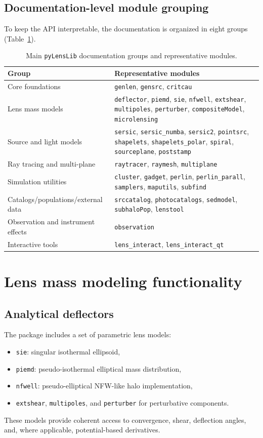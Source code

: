 \documentclass{aa}
\newcommand{\pylenslib}{\texttt{pyLensLib}\xspace}
\begin{document}
\subsection{Documentation-level module grouping}
To keep the API interpretable, the documentation is organized in eight groups (Table~\ref{tab:groups}).

\begin{table}
\caption{Main \pylenslib documentation groups and representative modules.}
\label{tab:groups}
\centering
\begin{tabular}{ll}
\toprule
\textbf{Group} & \textbf{Representative modules} \\
\midrule
Core foundations & \texttt{genlen}, \texttt{gensrc}, \texttt{critcau} \\
Lens mass models & \texttt{deflector}, \texttt{piemd}, \texttt{sie}, \texttt{nfwell}, \texttt{extshear}, \texttt{multipoles}, \texttt{perturber}, \texttt{compositeModel}, \texttt{microlensing} \\
Source and light models & \texttt{sersic}, \texttt{sersic\_numba}, \texttt{sersic2}, \texttt{pointsrc}, \texttt{shapelets}, \texttt{shapelets\_polar}, \texttt{spiral}, \texttt{sourceplane}, \texttt{poststamp} \\
Ray tracing and multi-plane & \texttt{raytracer}, \texttt{raymesh}, \texttt{multiplane} \\
Simulation utilities & \texttt{cluster}, \texttt{gadget}, \texttt{perlin}, \texttt{perlin\_parall}, \texttt{samplers}, \texttt{maputils}, \texttt{subfind} \\
Catalogs/populations/external data & \texttt{srccatalog}, \texttt{photocatalogs}, \texttt{sedmodel}, \texttt{subhaloPop}, \texttt{lenstool} \\
Observation and instrument effects & \texttt{observation} \\
Interactive tools & \texttt{lens\_interact}, \texttt{lens\_interact\_qt} \\
\bottomrule
\end{tabular}
\end{table}

\section{Lens mass modeling functionality}
\subsection{Analytical deflectors}
The package includes a set of parametric lens models:
\begin{itemize}
\item \texttt{sie}: singular isothermal ellipsoid,
\item \texttt{piemd}: pseudo-isothermal elliptical mass distribution,
\item \texttt{nfwell}: pseudo-elliptical NFW-like halo implementation,
\item \texttt{extshear}, \texttt{multipoles}, and \texttt{perturber} for perturbative components.
\end{itemize}
These models provide coherent access to convergence, shear, deflection angles, and, where applicable, potential-based derivatives.
\end{document}
